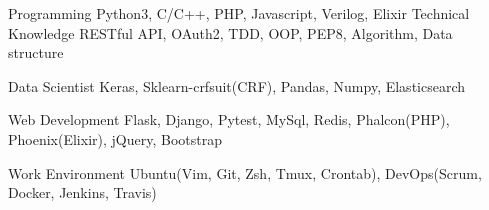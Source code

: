 

\begin{cvskills}

  \cvskill
    {Programming} %
    {Python3, C/C++, PHP, Javascript, Verilog, Elixir} %
  \cvskill
    {Technical Knowledge} %
    {RESTful API, OAuth2, TDD, OOP, PEP8, Algorithm, Data structure} %

  \cvskill
    {Data Scientist} %
    {Keras, Sklearn-crfsuit(CRF), Pandas, Numpy, Elasticsearch} %

  \cvskill
    {Web Development} %
    {Flask, Django, Pytest, MySql, Redis, Phalcon(PHP), Phoenix(Elixir), jQuery, Bootstrap} %

  \cvskill
    {Work Environment} %
    {Ubuntu(Vim, Git, Zsh, Tmux, Crontab), DevOps(Scrum, Docker, Jenkins, Travis)} %

\end{cvskills}
